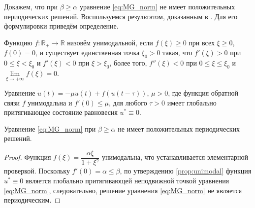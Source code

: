 Докажем, что при $\beta \geq \alpha$ уравнение \eqref{eq:MG_norm} не имеет положительных периодических решений. Воспользуемся результатом, доказанным в \cite[Proposition 3.1]{Roest2007}. Для его формулировки приведём определение.

\begin{definition}
	Функцию $f: \mathbb{R}_{+} \to \mathbb{R}$ назовём унимодальной, если $f(\xi) \geq 0$ при всех $\xi \geq 0$, $f(0) = 0$, и существует единственная точка $\xi_0 > 0$ такая, что $f'(\xi) > 0$ при $0 \leq \xi < \xi_0$ и $f'(\xi) < 0$ при $\xi > \xi_0$, более того, $f''(\xi) < 0$ при $0 \leq \xi \leq \xi_0$ и $\lim\limits_{\xi \to +\infty} f(\xi) = 0$.
\end{definition}

\begin{proposition}
	\label{prop:unimodal}
	\cite{Roest2007} Уравнение $\dot{u}(t) = -\mu u(t) + f(u(t - \tau))$, $\mu > 0$, где функция обратной связи $f$ унимодальна и $f'(0) \leq \mu$, для любого $\tau > 0$ имеет глобально притягивающее состояние равновесия $u^* \equiv 0$.
\end{proposition}
	
\begin{proposition}
	Уравнение \eqref{eq:MG_norm} при $\beta \geq \alpha$ не имеет положительных периодических решений.
\end{proposition}
\begin{proof}
	Функция $f(\xi) = \dfrac{\alpha \xi}{1 + \xi^{\gamma}}$ унимодальна, что устанавливается элементарной проверкой. Поскольку $f'(0) = \alpha \leq \beta$, по утверждению \eqref{prop:unimodal} функция $u^* \equiv 0$ является глобально притягивающей неподвижной точкой уравнения \eqref{eq:MG_norm}, следовательно, решение уравнения \eqref{eq:MG_norm} не является периодическим.
\end{proof}

